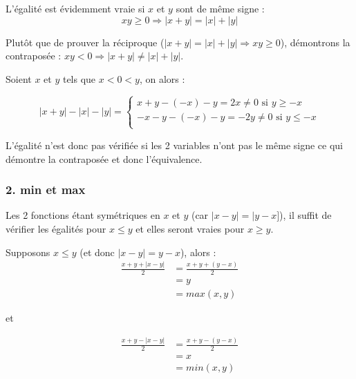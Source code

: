 \documentclass[a4paper,10pt]{report}
\begin{document}
L'égalité est évidemment vraie si $x$ et $y$ sont de même signe :
\begin{displaymath}
	xy \geq 0 \Longrightarrow |x+y| = |x| + |y|
\end{displaymath}

Plutôt que de prouver la réciproque ($|x+y| = |x| + |y| \Longrightarrow xy \geq 0$), démontrons
la contraposée : $xy < 0 \Longrightarrow |x+y| \neq |x| + |y|$.

Soient $x$ et $y$ tels que $ x < 0 < y$, on alors :

\begin{displaymath}
		|x+y| - |x| - |y|
		= \begin{cases}
			x+y-(-x)-y = 2x \neq 0 \text { si } y \geq -x \\
			-x-y-(-x)-y = -2y \neq 0 \text { si } y \leq -x \\
		\end{cases}
\end{displaymath}

L'égalité n'est donc pas vérifiée si les 2 variables n'ont pas le même signe ce qui démontre la contraposée
et donc l'équivalence.

\subsubsection*{2. min et max}

Les 2 fonctions étant symétriques en $x$ et $y$ (car $|x-y| = |y-x]$), il suffit de vérifier les égalités
pour $x \leq y$ et elles seront vraies pour $x \geq y$.

Supposons $x \leq y$ (et donc $|x-y|=y-x$), alors :
\begin{equation*}
	\begin{split}
		\frac{x + y + |x-y|}{2} &= \frac{x + y + (y-x)}{2} \\
		                        &= y \\
		                        &= max(x,y)
	\end{split}
\end{equation*}

et

\begin{equation*}
	\begin{split}
		\frac{x + y - |x-y|}{2} &= \frac{x + y - (y-x)}{2} \\
		&= x \\
		&= min(x,y)
	\end{split}
\end{equation*}
\end{document}
